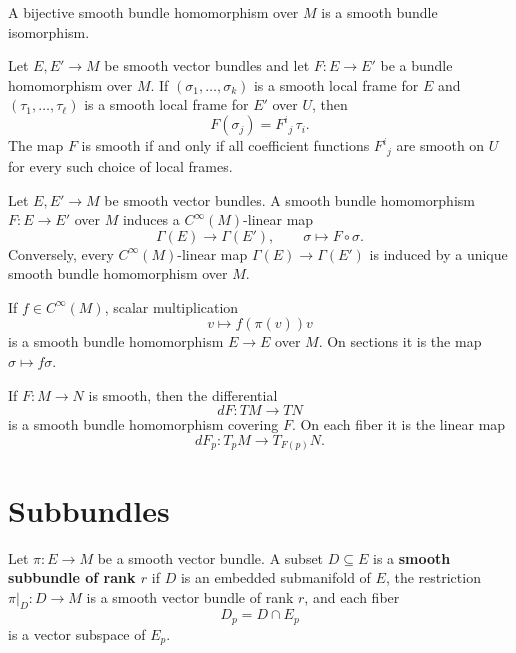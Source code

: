 \documentclass[12pt, oneside]{book}
\begin{document}
\begin{proposition}
    A bijective smooth bundle homomorphism over $M$ is a smooth bundle isomorphism.
\end{proposition}

\begin{proposition}
    Let $E,E'\rightarrow M$ be smooth vector bundles and let $F:E\rightarrow E'$ be a bundle homomorphism over $M$. If $(\sigma_1,\ldots,\sigma_k)$ is a smooth local frame for $E$ and $(\tau_1,\ldots,\tau_\ell)$ is a smooth local frame for $E'$ over $U$, then
    \[
        F(\sigma_j)=F^i{}_j\,\tau_i.
    \]
    The map $F$ is smooth if and only if all coefficient functions $F^i{}_j$ are smooth on $U$ for every such choice of local frames.
\end{proposition}

\begin{lemma}
    Let $E,E'\rightarrow M$ be smooth vector bundles. A smooth bundle homomorphism $F:E\rightarrow E'$ over $M$ induces a $C^\infty(M)$-linear map
    \[
        \Gamma(E)\rightarrow \Gamma(E'),
        \qquad
        \sigma\mapsto F\circ\sigma.
    \]
    Conversely, every $C^\infty(M)$-linear map $\Gamma(E)\rightarrow \Gamma(E')$ is induced by a unique smooth bundle homomorphism over $M$.
\end{lemma}

\begin{example}
    If $f\in C^\infty(M)$, scalar multiplication
    \[
        v\mapsto f(\pi(v))v
    \]
    is a smooth bundle homomorphism $E\rightarrow E$ over $M$. On sections it is the map $\sigma\mapsto f\sigma$.
\end{example}

\begin{example}
    If $F:M\rightarrow N$ is smooth, then the differential
    \[
        dF:TM\rightarrow TN
    \]
    is a smooth bundle homomorphism covering $F$. On each fiber it is the linear map
    \[
        dF_p:T_pM\rightarrow T_{F(p)}N.
    \]
\end{example}

\section{Subbundles}

\begin{definition}
    Let $\pi:E\rightarrow M$ be a smooth vector bundle. A subset $D\subseteq E$ is a \textbf{smooth subbundle of rank $r$} if $D$ is an embedded submanifold of $E$, the restriction $\pi|_D:D\rightarrow M$ is a smooth vector bundle of rank $r$, and each fiber
    \[
        D_p=D\cap E_p
    \]
    is a vector subspace of $E_p$.
\end{definition}
\end{document}
